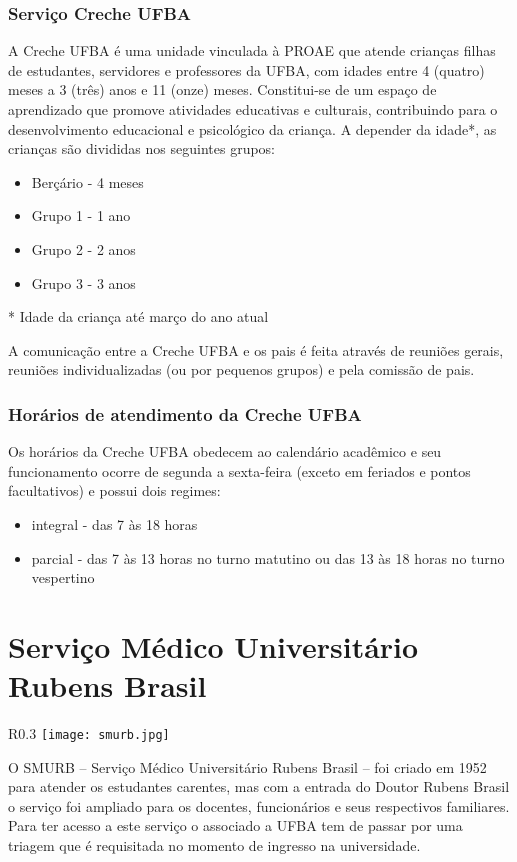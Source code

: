     \subsubsection{Serviço Creche UFBA}
        A Creche UFBA é uma unidade vinculada à PROAE que atende crianças filhas de estudantes, servidores e professores da UFBA, com idades entre 4 (quatro) meses a 3 (três) anos e 11 (onze) meses. Constitui-se de um espaço de aprendizado que promove atividades educativas e culturais, contribuindo para o desenvolvimento educacional e psicológico da criança.
        A depender da idade*, as crianças são divididas nos seguintes grupos:
            \begin{itemize}
                \item Berçário - 4 meses
                \item Grupo 1 - 1 ano
                \item Grupo 2 - 2 anos
                \item Grupo 3 - 3 anos
            \end{itemize}
            \begin{remark}
                * Idade da criança até março do ano atual
            \end{remark}
        A comunicação entre a Creche UFBA e os pais é feita através de reuniões gerais, reuniões individualizadas (ou por pequenos grupos) e pela comissão de pais.
    \subsubsection{Horários de atendimento da Creche UFBA}
        Os horários da Creche UFBA obedecem ao calendário acadêmico e seu funcionamento ocorre de segunda a sexta-feira (exceto em feriados e pontos facultativos) e possui dois regimes:
        \begin{itemize}
            \item integral - das 7 às 18 horas
            \item parcial - das 7 às 13 horas no turno matutino ou das 13 às 18 horas no turno vespertino
        \end{itemize}

\section{Serviço Médico Universitário Rubens Brasil}
    \begin{wrapfigure}{R}{0.3\textwidth}
            \centering
            \texttt{[image: smurb.jpg]}
        \end{wrapfigure}         
        O SMURB – Serviço Médico Universitário Rubens Brasil – foi criado em 1952 para atender os estudantes carentes, mas com a entrada do Doutor Rubens Brasil o serviço foi ampliado para os docentes, funcionários e seus respectivos familiares. Para ter acesso a este serviço o associado a UFBA tem de passar por uma triagem que é requisitada no momento de ingresso na universidade.

